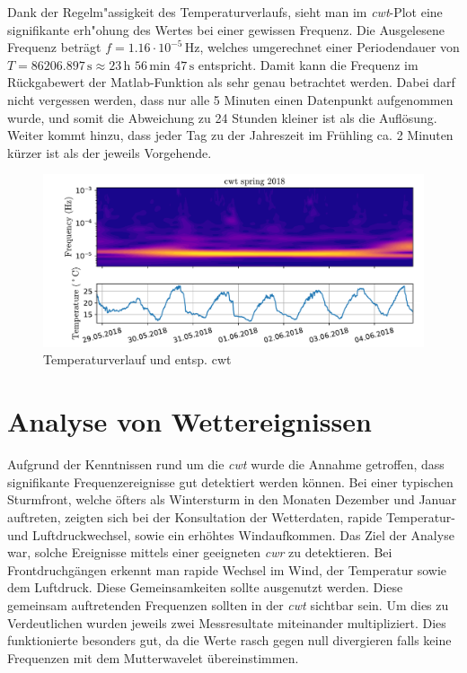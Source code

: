 \begin{refsection}
Dank der Regelm"assigkeit des Temperaturverlaufs, sieht man im \textit{cwt}-Plot eine signifikante erh"ohung des Wertes bei einer gewissen Frequenz.
Die Ausgelesene Frequenz beträgt $f = 1.16\cdot10^{-5} \,\text{Hz}$, welches umgerechnet einer Periodendauer von $T = 86206.897\,\text{s}\approx 23\,\text{h }56\,\text{min } 47\,\text{s}$ entspricht.
Damit kann die Frequenz im Rückgabewert der Matlab-Funktion als sehr genau betrachtet werden.
Dabei darf nicht vergessen werden, dass nur alle 5 Minuten einen Datenpunkt aufgenommen wurde, und somit die Abweichung zu 24 Stunden kleiner ist als die Auflösung.
Weiter kommt hinzu, dass jeder Tag zu der Jahreszeit im Frühling ca. 2 Minuten kürzer ist als der jeweils Vorgehende\cite{online:sunset_time}.

\begin{figure}[h]
	\centering
	\includegraphics[width=1\textwidth]{papers/wwt/images/data_spring.pdf}
	\caption{Temperaturverlauf und entsp. cwt}
	\label{fig:cwt_zoom}
\end{figure}




\section{Analyse von Wettereignissen}
Aufgrund der Kenntnissen rund um die \textit{cwt} wurde die Annahme getroffen, dass signifikante Frequenzereignisse gut detektiert werden können.
Bei einer typischen Sturmfront, welche öfters als Wintersturm in den Monaten Dezember und Januar auftreten, zeigten sich bei der Konsultation der Wetterdaten, rapide Temperatur- und Luftdruckwechsel, sowie ein erhöhtes Windaufkommen.
Das Ziel der Analyse war, solche Ereignisse mittels einer geeigneten \textit{cwr} zu detektieren.
Bei Frontdruchgängen erkennt man rapide Wechsel im Wind, der Temperatur sowie dem Luftdruck.
Diese Gemeinsamkeiten sollte ausgenutzt werden. Diese gemeinsam auftretenden Frequenzen sollten in der \textit{cwt} sichtbar sein.
Um dies zu Verdeutlichen wurden jeweils zwei Messresultate miteinander multipliziert.
Dies funktionierte besonders gut, da die Werte rasch gegen null divergieren falls keine Frequenzen mit dem Mutterwavelet übereinstimmen. 


\end{refsection}
